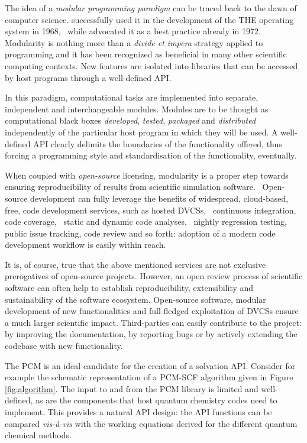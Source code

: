 The idea of a \emph{modular programming paradigm} can be traced back to
the dawn of computer science. \citeauthor{Dijkstra1968-zp}
successfully used it in the development of the THE operating
system in 1968,~\autocite{Dijkstra1968-zp} while
\citeauthor{Parnas1972-im} advocated it as a best practice already in
1972.~\autocite{Parnas1972-im}
Modularity is nothing more than a \emph{divide et impera} strategy
applied to programming and it has been recognized as beneficial in many
other scientific computing contexts.
New features are isolated into libraries that can be accessed by host
programs through a well-defined \ac{API}.

In this paradigm, computational tasks are implemented into separate,
independent and interchangeable modules.
Modules are to be thought as computational black boxes \emph{developed},
\emph{tested}, \emph{packaged} and \emph{distributed} independently of
the particular host program in which they will be used.
A well-defined \ac{API} clearly delimits the boundaries of the functionality
offered, thus forcing a programming style and standardisation of the
functionality, eventually.~\autocite{Reddy2011-sd}

When coupled with \emph{open-source} licensing, modularity is a proper
step towards ensuring reproducibility of results from scientific
simulation software.~\autocite{Gezelter2015-gz, Krylov2015-fs,
Jacob2016-oq}
Open-source development can fully leverage the benefits of widespread,
cloud-based, free, code development services, such as hosted
\acp{DVCS},~\autocite{github, gitlab} continuous
integration,~\autocite{travis-ci, appveyor-ci} code
coverage,~\autocite{coveralls} static and dynamic code
analyses,~\autocite{coverity-scan} nightly regression testing, public
issue tracking, code review and so forth: adoption of a modern code
development workflow is easily within reach.

It is, of course, true that the above mentioned services are not
exclusive prerogatives of open-source projects. However, an open review
process of scientific software can often help to establish
reproducibility, extensibility and sustainability of the software
ecosystem.
Open-source software, modular development of new functionalities and
full-fledged exploitation of \acsp{DVCS} ensure a much larger scientific
impact. Third-parties can easily contribute to the project: by improving
the documentation, by reporting bugs or by actively extending the
codebase with new functionality.

The \acs{PCM} is an ideal candidate for the creation of a solvation
\acs{API}. Consider for example the schematic representation of a
\acs{PCM}-\acs{SCF} algorithm given in Figure \ref{fig:algorithm}.
The input to and from the \acs{PCM} library is limited and well-defined,
as are the components that host quantum chemistry codes need to
implement.
This provides a natural \acs{API} design: the \acs{API} functions can be
compared \emph{vis-à-vis} with the working equations derived for the
different quantum chemical methods.

